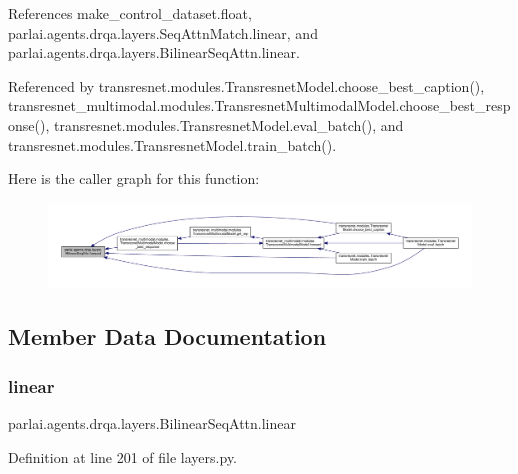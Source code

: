 References make\+\_\+control\+\_\+dataset.\+float, parlai.\+agents.\+drqa.\+layers.\+Seq\+Attn\+Match.\+linear, and parlai.\+agents.\+drqa.\+layers.\+Bilinear\+Seq\+Attn.\+linear.



Referenced by transresnet.\+modules.\+Transresnet\+Model.\+choose\+\_\+best\+\_\+caption(), transresnet\+\_\+multimodal.\+modules.\+Transresnet\+Multimodal\+Model.\+choose\+\_\+best\+\_\+response(), transresnet.\+modules.\+Transresnet\+Model.\+eval\+\_\+batch(), and transresnet.\+modules.\+Transresnet\+Model.\+train\+\_\+batch().

Here is the caller graph for this function\+:
\nopagebreak
\begin{figure}[H]
\begin{center}
\leavevmode
\includegraphics[width=350pt]{classparlai_1_1agents_1_1drqa_1_1layers_1_1BilinearSeqAttn_af6775803498ad914cd5e74cd228927e6_icgraph}
\end{center}
\end{figure}


\subsection{Member Data Documentation}
\mbox{\label{classparlai_1_1agents_1_1drqa_1_1layers_1_1BilinearSeqAttn_a9ec3eb5a5a3f38a5826b7dc02abbe925}} 
\subsubsection{\texorpdfstring{linear}{linear}}
{\footnotesize\ttfamily parlai.\+agents.\+drqa.\+layers.\+Bilinear\+Seq\+Attn.\+linear}



Definition at line 201 of file layers.\+py.



